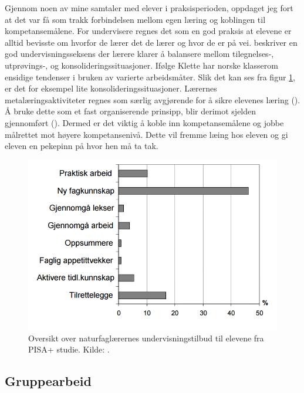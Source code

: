 \documentclass[main.tex]{subfiles}
\begin{document}
Gjennom noen av mine samtaler med elever i praksisperioden, oppdaget jeg fort at det var få som trakk forbindelsen mellom egen læring og koblingen til kompetansemålene. For undervisere regnes det som en god praksis at elevene er alltid bevisste om hvorfor de lærer det de lærer og hvor de er på vei.  beskriver en god undervisningsseksens der lærere klarer å balansere mellom tilegnelses-, utprøvings-, og konsolideringssituasjoner. Ifølge Klette har norske klasserom ensidige tendenser i bruken av varierte arbeidsmåter. Slik det kan ses fra figur \ref{fig:odeg10}, er det for eksempel lite konsolideringssituasjoner. Lærernes metalæringsaktiviteter regnes som særlig avgjørende for å sikre elevenes læring (). Å bruke dette som et fast organiserende prinsipp, blir derimot sjelden gjennomført (). Dermed er det viktig å koble inn kompetansemålene og jobbe målrettet mot høyere kompetansenivå. Dette vil fremme læing hos eleven og gi eleven en pekepinn på hvor hen må ta tak. \newline

\begin{figure}[h!]
\includegraphics[scale = 0.6]{../figures/undervisnings_aktivitet.png}
\caption{Oversikt over naturfaglærernes undervisningstilbud til elevene fra PISA+ studie. Kilde: 
\protect{}.}
\label{fig:odeg10}
\end{figure}

\subsection*{Gruppearbeid}
\end{document}
